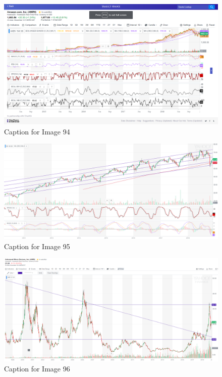 \documentclass{article}
\begin{document}
\vspace{10pt}

\begin{figure}[!htb]
    \centering
    \includegraphics[width=\textwidth]{imgs/94.png}
    \caption{Caption for Image 94}
\end{figure}

\vspace{10pt}

\begin{figure}[!htb]
    \centering
    \includegraphics[width=\textwidth]{imgs/95.png}
    \caption{Caption for Image 95}
\end{figure}

\vspace{10pt}

\begin{figure}[!htb]
    \centering
    \includegraphics[width=\textwidth]{imgs/96.png}
    \caption{Caption for Image 96}
\end{figure}
\end{document}
